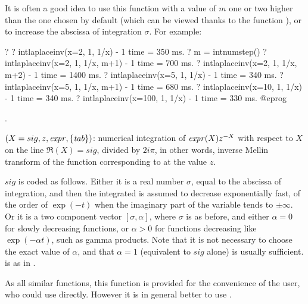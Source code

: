 It is often a good idea to use this function with a value of $m$ one or two
higher than the one chosen by default (which can be viewed thanks to the
function ), or to increase the abscissa of integration
$\sigma$. For example:

\bprog
? 
? intlaplaceinv(x=2, 1, 1/x) - 1
time = 350 ms.
? m = intnumstep()
? intlaplaceinv(x=2, 1, 1/x, m+1) - 1
time = 700 ms.
? intlaplaceinv(x=2, 1, 1/x, m+2) - 1
time = 1400 ms.
? intlaplaceinv(x=5, 1, 1/x) - 1
time = 340 ms.
? intlaplaceinv(x=5, 1, 1/x, m+1) - 1
time = 680 ms.
? intlaplaceinv(x=10, 1, 1/x) - 1
time = 340 ms.
? intlaplaceinv(x=100, 1, 1/x) - 1
time = 330 ms.
@eprog

.

$(X=sig,z,\hbox{\it expr\/},\{\hbox{\it tab\/}\})$: numerical
integration of $\hbox{\it expr\/}(X)z^{-X}$ with respect to $X$ on the line
$\Re(X)=sig$, divided by $2i\pi$, in other words, inverse Mellin transform of
the function corresponding to  at the value $z$.

$sig$ is coded as follows. Either it is a real number $\sigma$, equal to the
abscissa of integration, and then the integrated is assumed to decrease
exponentially fast, of the order of $\exp(-t)$ when the imaginary part of the
variable tends to $\pm\infty$. Or it is a two component vector
$[\sigma,\alpha]$, where $\sigma$ is as before, and either $\alpha=0$ for
slowly decreasing functions, or $\alpha>0$ for functions decreasing like
$\exp(-\alpha t)$, such as gamma products. Note that it is not necessary to
choose the exact value of $\alpha$, and that $\alpha=1$ (equivalent to $sig$
alone) is usually sufficient.  is as in .

As all similar functions, this function is provided for the convenience of
the user, who could use  directly. However it is in general
better to use .

